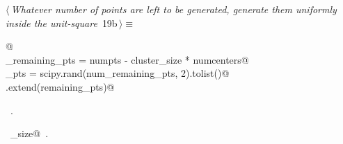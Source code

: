 \documentclass[11.5pt]{report}
\begin{document}
\vspace{-0.8cm} \newchunk
\begin{flushleft} \small
\begin{minipage}{\linewidth}\label{scrap20}\raggedright\small
{} $\langle\,${\itshape Whatever number of points are left to be generated, generate them uniformly inside the unit-square}\nobreak\ {\footnotesize {19b}}$\,\rangle\equiv$
\vspace{-1ex}
\begin{list}{}{} \item
\mbox{}\verb@   @\\
\mbox{}\verb@num_remaining_pts = numpts - cluster_size * numcenters@\\
\mbox{}\verb@remaining_pts = scipy.rand(num_remaining_pts, 2).tolist()@\\
\mbox{}\verb@points.extend(remaining_pts)@\\
\mbox{}\verb@@{\NWsep}
\end{list}
\vspace{-1.5ex}
\footnotesize
\begin{list}{}{\setlength{\itemsep}{-\parsep}\setlength{\itemindent}{-\leftmargin}}
\item \NWtxtMacroRefIn\ .
\item \NWtxtIdentsUsed\nobreak\  \verb@cluster_size@\nobreak\ .
\item{}
\end{list}
\end{minipage}\vspace{4ex}
\end{flushleft}
\end{document}
